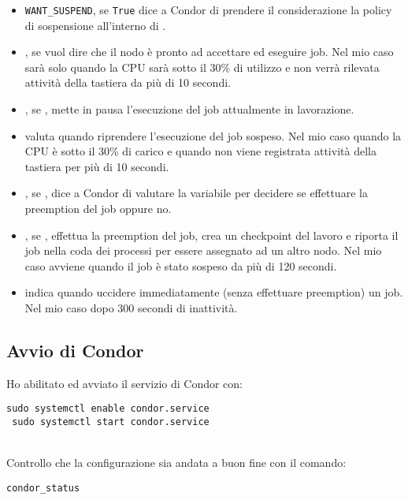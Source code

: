 \begin{itemize}
	\item \lstinline[style=cmd]|WANT_SUSPEND|, se \lstinline[style=cmd]|True| dice a Condor di prendere il considerazione la policy di sospensione all'interno di .
	\item {}, se  vuol dire che il nodo \`{e} pronto ad accettare ed eseguire job. Nel mio caso sar\`{a}  solo quando la CPU sar\`{a} sotto il 30\% di utilizzo e non verr\`{a} rilevata attivit\`{a} della tastiera da pi\`{u} di 10 secondi.
	\item {}, se , mette in pausa l'esecuzione del job attualmente in lavorazione.
	\item {} valuta quando riprendere l'esecuzione del job sospeso. Nel mio caso quando la CPU \`{e} sotto il 30\% di carico e quando non viene registrata attivit\`{a} della tastiera per pi\`{u} di 10 secondi.
	\item {}, se , dice a Condor di valutare la variabile  per decidere se effettuare la preemption del job oppure no.
	\item {}, se , effettua la preemption del job, crea un checkpoint del lavoro e riporta il job nella coda dei processi per essere assegnato ad un altro nodo. Nel mio caso avviene quando il job \`{e} stato sospeso da pi\`{u} di 120 secondi.
	\item {} indica quando uccidere immediatamente (senza effettuare preemption) un job. Nel mio caso dopo 300 secondi di inattivit\`{a}.
\end{itemize}

\subsection{Avvio di Condor}

Ho abilitato ed avviato il servizio di Condor con:

\begin{lstlisting}[style=cmd]
 sudo systemctl enable condor.service
 sudo systemctl start condor.service
\end{lstlisting}
\ \\
Controllo che la configurazione sia andata a buon fine con il comando:

\begin{lstlisting}[style=cmd]
 condor_status
\end{lstlisting}


